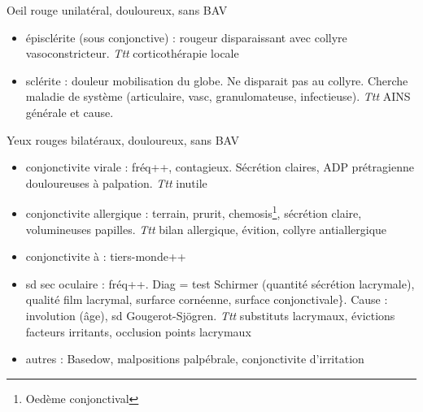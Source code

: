 \documentclass[11pt]{article}
\begin{document}
Oeil rouge unilatéral, douloureux, sans BAV
\begin{itemize}
\item épisclérite (sous conjonctive) : rougeur disparaissant avec collyre
vasoconstricteur. \emph{Ttt} corticothérapie locale
\item sclérite : douleur \inc mobilisation du globe. Ne disparait pas au
collyre. Cherche maladie de système (articulaire, vasc, granulomateuse,
infectieuse). \emph{Ttt} AINS générale et cause.
\end{itemize}

Yeux rouges bilatéraux, douloureux, sans BAV
\begin{itemize}
\item conjonctivite virale : fréq++, contagieux. Sécrétion claires, ADP prétragienne
douloureuses à palpation. \emph{Ttt} inutile
\item conjonctivite allergique : terrain, prurit, chemosis\footnote{Oedème conjonctival}, sécrétion claire,
volumineuses papilles. \emph{Ttt} bilan allergique, évition, collyre antiallergique
\item conjonctivite à  : tiers-monde++
\item sd sec oculaire : fréq++. Diag = test Schirmer (quantité sécrétion lacrymale),
qualité film lacrymal, surfarce cornéenne, surface conjonctivale\}. Cause :
involution (âge), sd Gougerot-Sjögren. \emph{Ttt} substituts lacrymaux, évictions
facteurs irritants, occlusion points lacrymaux
\item autres : Basedow, malpositions palpébrale, conjonctivite d'irritation
\end{itemize}
\end{document}
